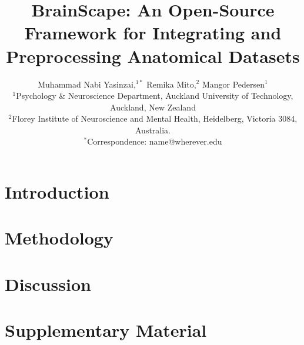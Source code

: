 \documentclass[]{imag-ms-template}
\title{BrainScape: An Open-Source Framework for Integrating and Preprocessing Anatomical Datasets}
\author{Muhammad Nabi Yasinzai,$^{1\ast}$ Remika Mito,$^{2}$ Mangor Pedersen$^{1}$\\
{\small $^{1}$Psychology \& Neuroscience Department, Auckland University of Technology,}\\
{\small Auckland, New Zealand}\\
{\small $^{2}$Florey Institute of Neuroscience and Mental Health, Heidelberg, Victoria 3084, Australia.}\\
{\small $^\ast$Correspondence: name@wherever.edu}
}
\begin{document}
 


\maketitle 

\begin{abstract}
    
\end{abstract}



\section{Introduction}



\section{Methodology}



\section{Discussion}


\section{Supplementary Material}



\printbibliography
\end{document}
